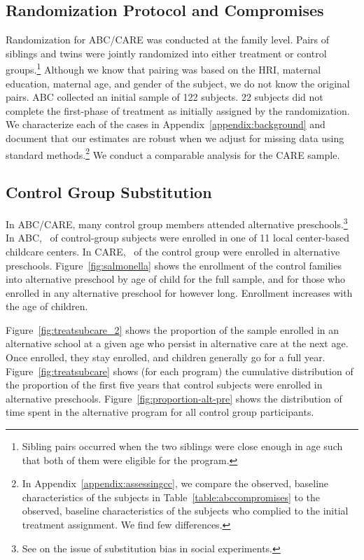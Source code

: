 \subsection{Randomization Protocol and Compromises} \label{section:randomization}

Randomization for ABC/CARE was conducted at the family level. Pairs of siblings and twins were jointly randomized into either treatment or control groups.\footnote{Sibling pairs occurred when the two siblings were close enough in age such that both of them were eligible for the program.} Although we know that pairing was based on the HRI, maternal education, maternal age, and gender of the subject, we do not know the original pairs. ABC collected an initial sample of 122 subjects. 22 subjects did not complete the first-phase of treatment as initially assigned by the randomization. We characterize each of the cases in Appendix~\ref{appendix:background} and document that our estimates are robust when we adjust for missing data using standard methods.\footnote{In Appendix~\ref{appendix:assessingcc}, we compare the observed, baseline characteristics of the subjects in Table~\ref{table:abccompromises} to the observed, baseline characteristics of the subjects who complied to the initial treatment assignment. We find few differences.} We conduct a comparable analysis for the CARE sample.

\subsection{Control Group Substitution}

In ABC/CARE, many control group members attended alternative preschools.\footnote{See \cite{Heckman_Hohmann_etal_2000_QJE} on the issue of substitution bias in social experiments.} In ABC, \treatsubsabc\ of control-group subjects were enrolled in one of 11 local center-based childcare centers. In CARE, \treatsubscarec\ of the control group were enrolled in alternative preschools. Figure~\ref{fig:salmonella} shows the enrollment of the control families into alternative preschool by age of child for the full sample, and for those who enrolled in any alternative preschool for however long. Enrollment increases with the age of children.

Figure~\ref{fig:treatsubcare_2} shows the proportion of the sample enrolled in an alternative school at a given age who persist in alternative care at the next age. Once enrolled, they stay enrolled, and children generally go for a full year.  Figure~\ref{fig:treatsubcare} shows (for each program) the cumulative distribution of the proportion of the first five years that control subjects were enrolled in alternative preschools. Figure~\ref{fig:proportion-alt-pre} shows the distribution of time spent in the alternative program for all control group participants.

